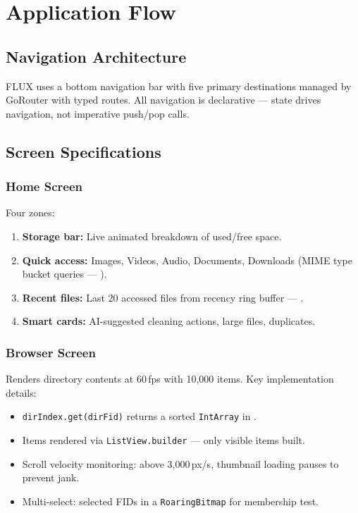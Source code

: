 \chapter{Application Flow}

\section{Navigation Architecture}

FLUX uses a bottom navigation bar with five primary destinations managed by GoRouter with typed routes. All navigation is declarative --- state drives navigation, not imperative push/pop calls.

\section{Screen Specifications}

\subsection{Home Screen}

Four zones:
\begin{enumerate}
  \item \textbf{Storage bar:} Live animated breakdown of used/free space.
  \item \textbf{Quick access:} Images, Videos, Audio, Documents, Downloads (MIME type bucket queries --- ).
  \item \textbf{Recent files:} Last 20 accessed files from recency ring buffer --- .
  \item \textbf{Smart cards:} AI-suggested cleaning actions, large files, duplicates.
\end{enumerate}

\subsection{Browser Screen}

Renders directory contents at 60\,fps with 10,000 items. Key implementation details:
\begin{itemize}
  \item \texttt{dirIndex.get(dirFid)} returns a sorted \texttt{IntArray} in .
  \item Items rendered via \texttt{ListView.builder} --- only visible items built.
  \item Scroll velocity monitoring: above 3,000\,px/s, thumbnail loading pauses to prevent jank.
  \item Multi-select: selected FIDs in a \texttt{RoaringBitmap} for  membership test.
\end{itemize}

